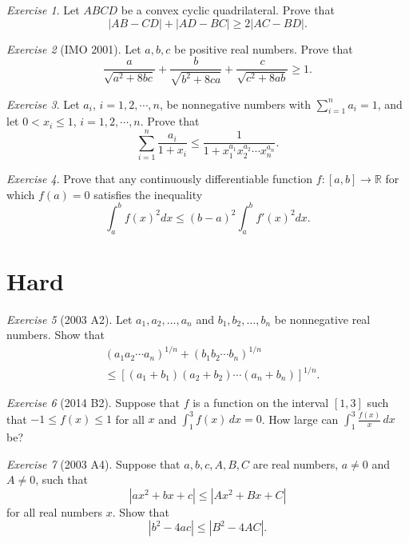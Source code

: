 \documentclass{article}
\theoremstyle{definition}
\theoremstyle{remark}
\newtheorem{exercise}{Exercise}
\begin{document}
\begin{exercise}
Let $ABCD$ be a convex cyclic quadrilateral. Prove that 
\[
|AB - CD|+ |AD - BC| \geq 2|AC - BD|.  
\]
\end{exercise}

\begin{exercise}[IMO 2001] 
Let $a, b, c$ be positive real numbers. Prove that 
\[\frac{a}{\sqrt{a^{2} + 8bc}} + \frac{b}{\sqrt{b^{2} + 8ca}} + \frac{c}{\sqrt{c^{2} + 8ab}} \geq 1.
\]
\end{exercise}

\begin{exercise}
Let $a_{i}$, $i = 1, 2,  \cdots, n$, be nonnegative numbers with $\sum_{i = 1}^{n} a_{i} = 1$,  and let $0 < x_{i} \leq 1$, $i = 1, 2, \cdots, n$. Prove that
\[
\sum_{i = 1}^{n}\frac{a_{i}}{1 + x_{i}} \leq \frac{1}{1 + x_{1}^{a_{1}}x_{2}^{a_{2}}\cdots x_{n}^{a_{n}}}. 
\]
\end{exercise}

\begin{exercise}
Prove that any continuously differentiable function $f: [a, b] \rightarrow \mathbb{R}$ for which $f(a) = 0$ satisfies the inequality 
\[
\int_{a}^{b} f(x)^{2} dx \leq (b - a)^{2}\int_{a}^{b} f'(x)^{2} dx.  
\]
\end{exercise}

\section{Hard}
\begin{exercise}[2003 A2]
Let $a_1, a_2, \dots, a_n$  and  $b_1, b_2, \dots, b_n$
be nonnegative real numbers.
Show that
\begin{align*}
& (a_1 a_2 \cdots a_n)^{1/n} + (b_1 b_2 \cdots b_n)^{1/n} \\
&\leq [(a_1+b_1) (a_2+b_2) \cdots (a_n + b_n) ]^{1/n}.
\end{align*}
\end{exercise}


\begin{exercise}[2014 B2]
Suppose that $f$ is a function on the interval $[1,3]$ such that $-1 \leq f(x) \leq 1$ for all $x$ and $\int_1^3 f(x)\,dx = 0$. How large can $\int_1^3 \frac{f(x)}{x}\,dx$ be?
\end{exercise}

\begin{exercise}[2003 A4]
Suppose that $a,b,c,A,B,C$  are real numbers, $a\ne 0$ and $A \ne 0$, such that
\[| a x^2 + b x + c | \leq | A x^2 + B x + C |
\]
for all real numbers  $x$. Show that
\[| b^2 - 4 a c | \leq | B^2 - 4 A C |.
\]
\end{exercise}
\end{document}
